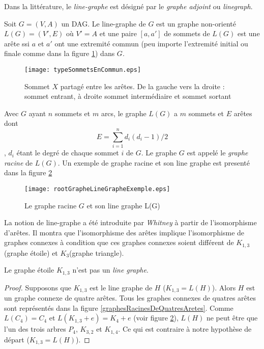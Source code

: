 Dans la litt\'erature, le {\em line-graphe} est d\'esign\'e par le {\em graphe adjoint} ou {\em linegraph}. 

\begin{definition}
Soit $G=(V,A)$ un DAG. 
Le line-graphe de $G$ est un graphe non-orient\'e $L(G) = (V',E)$ o\`u $V'=A$ et une paire $[a,a']$ de sommets de $L(G)$ est une ar\^ete ssi $a$ et $a'$ ont une extremit\'e commun (peu importe l'extremit\'e initial ou finale comme dans la figure \ref{typeSommetsEnCommun}) dans $G$.
\end{definition}

\begin{figure}[htb!]\vspace{-0.5em}
	\centering
	\texttt{[image: typeSommetsEnCommun.eps]}\vspace{-0.5em}
	\caption{ Sommet $X$ partag\'e entre les ar\^etes. De la gauche vers la droite : sommet entrant, \`a droite sommet interm\'ediaire et sommet sortant }\vspace{-0.5em}
	\label{typeSommetsEnCommun}
\end{figure}

Avec $G$ ayant $n$ sommets et $m$ arcs, le graphe $L(G)$ a $m$ sommets et $E$ ar\^etes dont 
$$ E = \sum_{i=1 }^{n} d_i(d_i -1)/2$$, 
$d_i$ \'etant le degr\'e de chaque sommet $i$ de $G$.
Le graphe $G$ est  appel\'e le {\em graphe racine} de $L(G)$. 
Un exemple de graphe racine et son line graphe est present\'e dans la figure \ref{rootGrapheLineGrapheExemple}

\begin{figure}[htb!]\vspace{-0.5em}
	\centering
	\texttt{[image: rootGrapheLineGrapheExemple.eps]}\vspace{-0.5em}
	\caption{ Le graphe racine $G$ et son line graphe L(G) }\vspace{-0.5em}
	\label{rootGrapheLineGrapheExemple}
\end{figure}

La notion de line-graphe a \'et\'e introduite par {\em Whitney} \cite{isomorphismeLineGraphe} \`a partir de l'isomorphisme d'ar\^etes. Il montra que l'isomorphisme des ar\^etes implique l'isomorphisme de graphes connexes \`a condition que ces graphes connexes soient diff\'erent de $K_{1,3}$(graphe \'etoile) et $K_3$(graphe triangle).
\begin{proposition}
Le graphe \'etoile $K_{1,3}$ n'est pas un {\em line graphe}.
\end{proposition}
\begin{proof}
Supposons que $K_{1,3}$ est le line graphe de $H$ ($K_{1,3} = L(H)$). 
Alors $H$ est un graphe connexe de quatre ar\^etes.
Tous les graphes connexes de quatres ar\^etes sont repr\'esent\'es dans la figure  \ref{graphesRacinesDeQuatresAretes}. 
Comme $L(C_4) = C_4$  et $L(K_{1,3} + e) = K_4 + e$ (voir figure \ref{rootGrapheLineGrapheExemple}), $L(H)$ ne peut \^etre que l'un des trois arbres $P_4$, $K_{3,2}$ et $K_{1,4}$.
Ce qui est contraire \`a notre hypoth\`ese de d\'epart ($K_{1,3} = L(H)$).
\end{proof}

